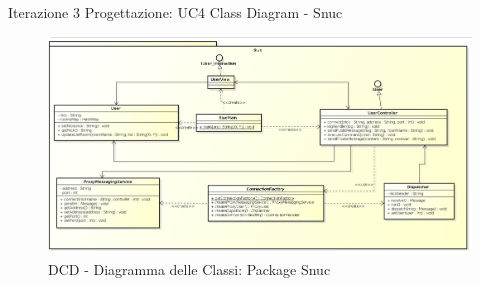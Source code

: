 \documentclass[t]{beamer} %
\begin{document}
\begin{frame} {Iterazione 3 Progettazione: UC4 Class Diagram - Snuc}
   \begin{figure}
     \includegraphics[scale=0.235]{image_astah/Iteration_3_DesignModel/ClassDiagramSnuc.png}{\centering}
     \caption{DCD - Diagramma delle Classi: Package Snuc }
     \label{fig_UC4_DCD_3} 
   \end{figure}
\end{frame}
\end{document}
